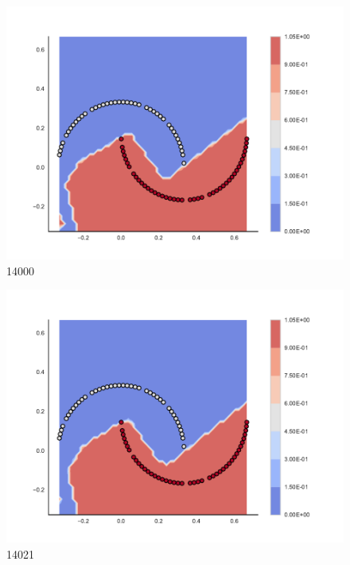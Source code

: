 \begin{subfigure}[b]{0.09\textwidth}
    \includegraphics[clip, trim=2.35cm 1.75cm 4.5cm 0cm,width=\textwidth]{img/convergence/14000.pdf}
    \caption{14000}
    \label{fig:convergence_14000}
\end{subfigure}
%
\begin{subfigure}[b]{0.09\textwidth}
    \includegraphics[clip, trim=2.35cm 1.75cm 4.5cm 0cm,width=\textwidth]{img/convergence/14021.pdf}
    \caption{14021}
    \label{fig:convergence_14021}
\end{subfigure}
%
